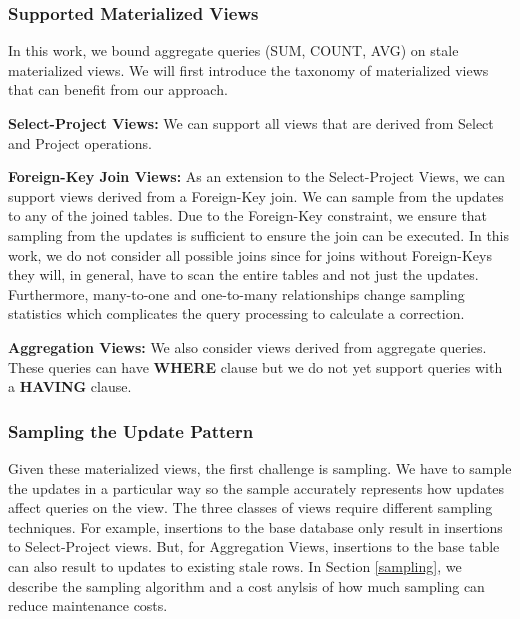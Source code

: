 \subsubsection{Supported Materialized Views}\label{subsubsec:supported-view}
In this work, we bound aggregate queries (SUM, COUNT, AVG) on stale materialized views.
We will first introduce the taxonomy of materialized views that can benefit from our approach. 
\vspace{1em}

\noindent\textbf{Select-Project Views: } We can support all views that are derived from Select and Project operations. 

\vspace{1em}

\noindent\textbf{Foreign-Key Join Views: } As an extension to the Select-Project Views, we can support views derived from a Foreign-Key join. We can sample from the updates to any of the joined tables. Due to the Foreign-Key constraint, we ensure that sampling from the updates is sufficient to ensure the join can be executed. In this work, we do not consider all possible joins since for joins without Foreign-Keys they will, in general, have to scan the entire tables and not just the updates. Furthermore, many-to-one and one-to-many relationships change sampling statistics which complicates the query processing to calculate a correction.

\vspace{1em}

\noindent\textbf{Aggregation Views: } We also consider views derived from aggregate queries. These queries can have \textbf{WHERE} clause but we do not yet support queries with a \textbf{HAVING} clause.

\subsubsection{Sampling the Update Pattern}
Given these materialized views, the first challenge is sampling.
We have to sample the updates in a particular way so the sample accurately represents how updates
affect queries on the view. 
The three classes of views require different sampling techniques.
For example, insertions to the base database only result in insertions to Select-Project views.
But, for Aggregation Views, insertions to the base table can also result to updates to existing stale rows.
In Section \ref{sampling}, we describe the sampling algorithm and a cost anylsis of how much sampling can reduce maintenance costs.

